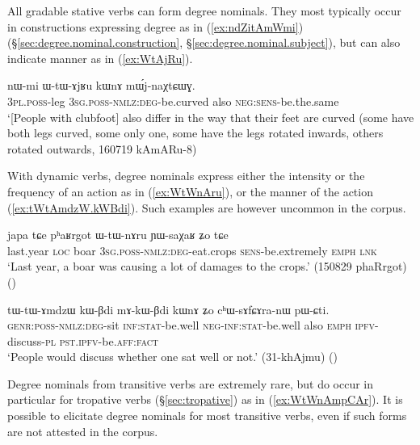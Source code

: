 All gradable stative verbs can form degree nominals. They most typically occur in constructions expressing degree as in (\ref{ex:ndZitAmWmi}) (§\ref{sec:degree.nominal.construction}, §\ref{sec:degree.nominal.subject}), but can also indicate manner as in (\ref{ex:WtAjRu}).

 \begin{exe}
	\ex \label{ex:WtAjRu}
	\gll nɯ-mi ɯ-tɯ-ɤjʁu kɯnɤ mɯ́j-naχtɕɯɣ. \\
	\textsc{3pl}.\textsc{poss}-leg \textsc{3sg}.\textsc{poss}-\textsc{nmlz}:\textsc{deg}-be.curved also \textsc{neg}:\textsc{sens}-be.the.same \\
	\glt `[People with clubfoot] also differ in the way that their feet are curved (some have both legs curved, some only one, some have the legs rotated inwards, others rotated outwards, 160719 kAmARu-8) 
\end{exe}

With dynamic verbs, degree nominals express either the intensity or the frequency of an action as in (\ref{ex:WtWnAru}), or the manner of the action (\ref{ex:tWtAmdzW.kWBdi}). Such examples are however uncommon in the corpus.

\begin{exe}
\ex \label{ex:WtWnAru}
\gll  japa tɕe pʰaʁrgot ɯ-tɯ-nɤru ɲɯ-saχaʁ ʑo tɕe \\
last.year \textsc{loc} boar  \textsc{3sg}.\textsc{poss}-\textsc{nmlz}:\textsc{deg}-eat.crops \textsc{sens}-be.extremely \textsc{emph} \textsc{lnk} \\
\glt `Last year, a boar was causing a lot of damages to the crops.' (150829 phaRrgot)
()
\end{exe}

\begin{exe}
\ex \label{ex:tWtAmdzW.kWBdi}
\gll tɯ-tɯ-ɤmdzɯ kɯ-βdi mɤ-kɯ-βdi kɯnɤ ʑo cʰɯ-sɤfɕɤra-nɯ pɯ-ɕti.  \\
\textsc{genr}:\textsc{poss}-\textsc{nmlz}:\textsc{deg}-sit \textsc{inf}:\textsc{stat}-be.well \textsc{neg}-\textsc{inf}:\textsc{stat}-be.well also \textsc{emph} \textsc{ipfv}-discuss-\textsc{pl} \textsc{pst}.\textsc{ipfv}-be.\textsc{aff}:\textsc{fact} \\
\glt `People would discuss whether one sat well or not.' (31-khAjmu) 	()
\end{exe}

Degree nominals from transitive verbs are extremely rare, but do occur in particular for tropative verbs (§\ref{sec:tropative}) as in (\ref{ex:WtWnAmpCAr}). It is possible to elicitate degree nominals for most transitive verbs, even if such forms are not attested in the corpus.
 
